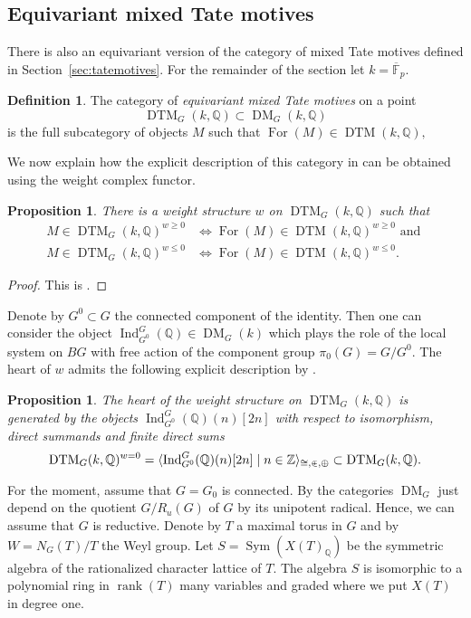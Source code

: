 \documentclass{amsart}
\theoremstyle{plain}
\newtheorem{proposition}[theorem]{Proposition}
\theoremstyle{TheoremNum}
\theoremstyle{definition}
\newtheorem{definition}[theorem]{Definition}
\theoremstyle{remark}
\numberwithin{equation}{section}
\newcommand{\F}{\mathbb{F}}
\newcommand{\Q}{\mathbb{Q}}
\newcommand{\Z}{\mathbb{Z}}
\newcommand{\DM}{\operatorname{DM}}
\newcommand{\DTM}{\operatorname{DTM}}
\newcommand{\Ind}{\operatorname{Ind}}
\newcommand{\For}{\operatorname{For}}
\begin{document}
\subsection{Equivariant mixed Tate motives} There is also an equivariant version of the category of mixed Tate motives defined in Section~\ref{sec:tatemotives}. For the remainder of the section let $k=\overline{\F}_p.$
\begin{definition}
The category of \emph{equivariant mixed Tate motives} on a  point $$\DTM_G(k,\Q)\subset\DM_G(k,\Q)$$
is the full subcategory of objects $M$ such that $\For(M)\in \DTM(k,\Q),$
\end{definition}
We now explain how the explicit description of this category in \cite[Theorem II.3.1]{soergel_equivariant_2018} can be obtained using the weight complex functor.
\begin{proposition}
There is a weight structure $w$ on $\DTM_G(k,\Q)$ such that
\begin{align*}
    M\in \DTM_G(k,\Q)^{w\geq 0} &\iff \For(M)\in \DTM(k,\Q)^{w\geq 0}\text{ and }\\
    M\in \DTM_G(k,\Q)^{w\leq 0} &\iff \For(M)\in \DTM(k,\Q)^{w\leq 0}.
\end{align*}
\end{proposition}
\begin{proof}
This is \cite[Proposition II.4.10]{soergel_equivariant_2018}.
\end{proof}
Denote by $G^0\subset G$ the connected component of the identity. Then one can consider the object $\Ind^G_{G^0}(\Q)\in \DM_G(k)$ which plays the role of the local system on $BG$ with free action of the component group $\pi_0(G)=G/G^0.$ The heart of $w$ admits the following explicit description by  \cite[Proposition II.4.5]{soergel_equivariant_2018}.
\begin{proposition}\label{prop:heartofweightstrutureequivariantmixedtate}
The heart of the weight structure on $\DTM_G(k,\Q)$ is generated by the objects $\Ind^G_{G^0}(\Q)(n)[2n]$ with respect to isomorphism, direct summands and finite direct sums
$$\DTM_G(k,\Q)^{w=0}=\langle \Ind^G_{G^0}(\Q)(n)[2n] \mid n \in \Z \rangle_{\cong,\inplus,\oplus}\subset \DTM_G(k,\Q).$$
\end{proposition}
For the moment, assume that $G=G_0$ is connected. By \cite[Proposition I.7.6]{soergel_equivariant_2018} the categories $\DM_G$ just depend on the quotient $G/R_u(G)$ of $G$ by its unipotent radical. Hence, we can assume that $G$ is reductive. Denote by $T$ a maximal torus in $G$ and by $W=N_G(T)/T$ the Weyl group. Let $S=\operatorname{Sym}(X(T)_\Q)$ be the symmetric algebra of the rationalized character lattice of $T.$ The algebra $S$ is isomorphic to a polynomial ring in $\operatorname{rank}(T)$ many variables and graded where we put $X(T)$ in degree one.
\end{document}
